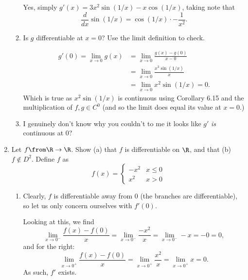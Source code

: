 \documentclass{article}
\begin{document}
\begin{enumerate}
\begin{enumerate}
                Yes, simply $g'(x) = 3x^{2}\sin(1/x) -x\cos(1/x)$, taking note that
                \[ \frac{d}{dx} \sin(1/x) = \cos(1/x) \cdot -\frac{1}{x^{2}}. \]

          \item Is $g$ differentiable at $x = 0$? Use the limit definition to check.

                \begin{align*}
                  g'(0) = \lim_{x \to 0}g(x) &= \lim_{x \to 0} \frac{g(x) - g(0)}{x - 0}\\
                  &= \lim_{x \to 0}\frac{x^{3}\sin(1/x)}{x}\\
                  &= \lim_{x \to 0}x^{2}\sin(1/x) = 0.
                \end{align*}
                Which is true as $x^{2}\sin(1/x)$ is continuous using Corollary 6.15 and
                the multiplication of $f, g \in C^{0}$ (and so the limit does equal its value at $x = 0$.)

          \item I genuinely don't know why you couldn't \textendash{} to me it looks like $g'$ \emph{is} continuous at 0?

        \end{enumerate}

  \item Let $f \from \R \to \R$. Show (a) that $f$ is differentiable on $\R$,
        and that (b) $f \notin D^{2}$. Define $f$ as
        \[ f(x) = \begin{cases}
          -x^{2} & x \le 0\\
          x^{2} & x > 0
        \end{cases} \]

        \begin{enumerate}

          \item Clearly, $f$ is differentiable away from 0 (the branches are differentiable),
                so let us only concern ourselves with $f'(0)$.

                Looking at this, we find
                \[
                  \lim_{x \to 0^{-}} \frac{f(x) - f(0)}{x} = \lim_{x \to 0^{-}}\frac{-x^{2}}{x} = \lim_{x \to 0^{-}} -x = -0 = 0,
                \]
                and for the right:
                \[
                  \lim_{x \to 0^{+}} \frac{f(x) - f(0)}{x} = \lim_{x \to 0^{+}}\frac{x^{2}}{x} = \lim_{x \to 0^{+}} x = 0.
                \]
                As such, $f'$ exists.


\end{enumerate}
\end{enumerate}
\end{document}
